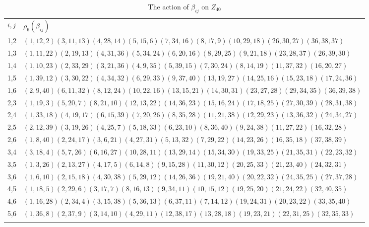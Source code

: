 \documentclass[12pt,a4paper]{article}
\numberwithin{equation}{section}
\numberwithin{table}{section}
\begin{document}
\begin{table}[!htbp]
\centering
\footnotesize
\captionsetup{font=footnotesize}
\caption{The action of $\beta_{ij}$ on $Z_{40}$}
\label{tab:PermutationRepresentationOnZ40Betaij}
\begin{tabular}{ll}
\hline\noalign{\smallskip}
$i,j$ & $\rho_6(\beta_{ij})$ \\
\noalign{\smallskip}\hline\noalign{\smallskip}
1,2   & $(1,12,2)(3,11,13)(4,28,14)(5,15,6)(7,34,16)(8,17,9)(10,29,18)(26,30,27)(36,38,37)$ \\
1,3   & $(1,11,22)(2,19,13)(4,31,36)(5,34,24)(6,20,16)(8,29,25)(9,21,18)(23,28,37)(26,39,30)$ \\
1,4   & $(1,10,23)(2,33,29)(3,21,36)(4,9,35)(5,39,15)(7,30,24)(8,14,19)(11,37,32)(16,20,27)$ \\
1,5   & $(1,39,12)(3,30,22)(4,34,32)(6,29,33)(9,37,40)(13,19,27)(14,25,16)(15,23,18)(17,24,36)$ \\
1,6   & $(2,9,40)(6,11,32)(8,12,24)(10,22,16)(13,15,21)(14,30,31)(23,27,28)(29,34,35)(36,39,38)$ \\
\noalign{\smallskip}\hline\noalign{\smallskip}
2,3   & $(1,19,3)(5,20,7)(8,21,10)(12,13,22)(14,36,23)(15,16,24)(17,18,25)(27,30,39)(28,31,38)$ \\
2,4   & $(1,33,18)(4,19,17)(6,15,39)(7,20,26)(8,35,28)(11,21,38)(12,29,23)(13,36,32)(24,34,27)$ \\
2,5   & $(2,12,39)(3,19,26)(4,25,7)(5,18,33)(6,23,10)(8,36,40)(9,24,38)(11,27,22)(16,32,28)$ \\
2,6   & $(1,8,40)(2,24,17)(3,6,21)(4,27,31)(5,13,32)(7,29,22)(14,23,26)(16,35,18)(37,38,39)$ \\
\noalign{\smallskip}\hline\noalign{\smallskip}
3,4   & $(3,18,4)(5,7,26)(6,16,27)(10,28,11)(13,29,14)(15,34,30)(19,33,25)(21,35,31)(22,23,32)$ \\
3,5   & $(1,3,26)(2,13,27)(4,17,5)(6,14,8)(9,15,28)(11,30,12)(20,25,33)(21,23,40)(24,32,31)$ \\
3,6   & $(1,6,10)(2,15,18)(4,30,38)(5,29,12)(14,26,36)(19,21,40)(20,22,32)(24,35,25)(27,37,28)$ \\
\noalign{\smallskip}\hline\noalign{\smallskip}
4,5   & $(1,18,5)(2,29,6)(3,17,7)(8,16,13)(9,34,11)(10,15,12)(19,25,20)(21,24,22)(32,40,35)$ \\
4,6   & $(1,16,28)(2,34,4)(3,15,38)(5,36,13)(6,37,11)(7,14,12)(19,24,31)(20,23,22)(33,35,40)$ \\
\noalign{\smallskip}\hline\noalign{\smallskip}
5,6   & $(1,36,8)(2,37,9)(3,14,10)(4,29,11)(12,38,17)(13,28,18)(19,23,21)(22,31,25)(32,35,33)$ \\
\noalign{\smallskip}\hline
\end{tabular}
\end{table}
\end{document}
